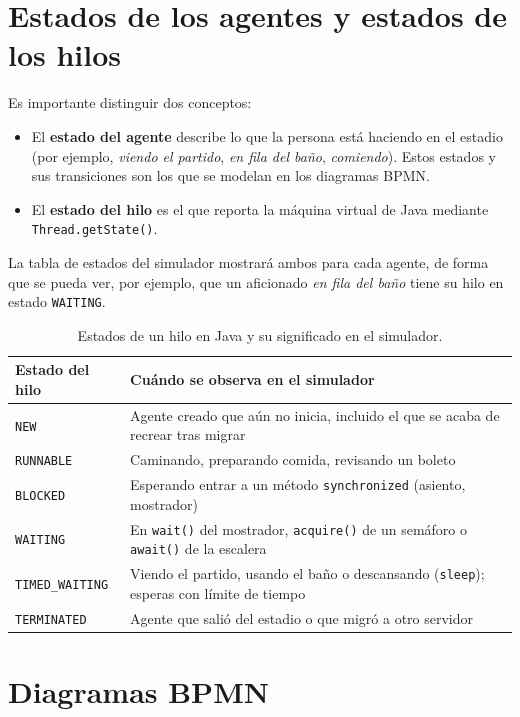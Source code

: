 \documentclass[11pt,letterpaper]{article}
\newcommand{\code}[1]{\texttt{#1}}
\begin{document}
\section{Estados de los agentes y estados de los hilos}

Es importante distinguir dos conceptos:
\begin{itemize}
  \item El \textbf{estado del agente} describe lo que la persona está haciendo en el estadio (por ejemplo, \emph{viendo el partido}, \emph{en fila del baño}, \emph{comiendo}). Estos estados y sus transiciones son los que se modelan en los diagramas BPMN.
  \item El \textbf{estado del hilo} es el que reporta la máquina virtual de Java mediante \code{Thread.getState()}.
\end{itemize}
La tabla de estados del simulador mostrará ambos para cada agente, de forma que se pueda ver, por ejemplo, que un aficionado \emph{en fila del baño} tiene su hilo en estado \code{WAITING}.

\begin{table}[H]
\centering
\small
\begin{tabularx}{\linewidth}{l L}
\toprule
Estado del hilo & Cuándo se observa en el simulador \\
\midrule
\code{NEW} & Agente creado que aún no inicia, incluido el que se acaba de recrear tras migrar \\
\code{RUNNABLE} & Caminando, preparando comida, revisando un boleto \\
\code{BLOCKED} & Esperando entrar a un método \code{synchronized} (asiento, mostrador) \\
\code{WAITING} & En \code{wait()} del mostrador, \code{acquire()} de un semáforo o \code{await()} de la escalera \\
\code{TIMED\_WAITING} & Viendo el partido, usando el baño o descansando (\code{sleep}); esperas con límite de tiempo \\
\code{TERMINATED} & Agente que salió del estadio o que migró a otro servidor \\
\bottomrule
\end{tabularx}
\caption{Estados de un hilo en Java y su significado en el simulador.}
\end{table}

\section{Diagramas BPMN}
\end{document}
